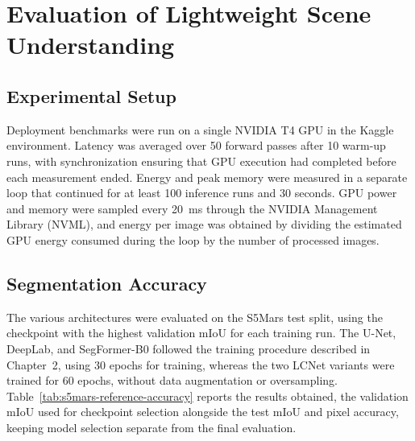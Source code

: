 \chapter{Evaluation of Lightweight Scene Understanding}

\section{Experimental Setup}
\label{sec:segmentation-experimental-setup}

Deployment benchmarks were run on a single NVIDIA T4 GPU in the Kaggle environment. Latency was averaged over 50 forward passes after 10 warm-up runs, with synchronization ensuring that GPU execution had completed before each measurement ended. Energy and peak memory were measured in a separate loop that continued for at least 100 inference runs and 30 seconds. GPU power and memory were sampled every 20~ms through the NVIDIA Management Library (NVML), and energy per image was obtained by dividing the estimated GPU energy consumed during the loop by the number of processed images.

\section{Segmentation Accuracy}
\label{sec:segmentation-accuracy}

The various architectures were evaluated on the S5Mars test split, using the checkpoint with the highest validation mIoU for each training run. The U-Net, DeepLab, and SegFormer-B0 followed the training procedure described in Chapter~2, using 30 epochs for training, whereas the two LCNet variants were trained for 60 epochs, without data augmentation or oversampling. Table~\ref{tab:s5mars-reference-accuracy} reports the results obtained, the validation mIoU used for checkpoint selection alongside the test mIoU and pixel accuracy, keeping model selection separate from the final evaluation.

